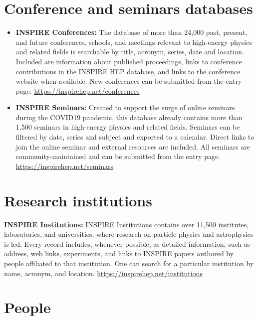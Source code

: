 \section{Conference and seminars databases}\label{databases:sec:conference}
\begin{itemize}
\tightlist
{}
\item
  \textbf{INSPIRE Conferences:} The database of more than 24,000 past,
  present, and future conferences, schools, and meetings relevant to
  high-energy physics and related fields is searchable by title,
  acronym, series, date and location. Included are information about
  published proceedings, links to conference contributions in the
  INSPIRE HEP database, and links to the conference website when
  available. New conferences can be submitted from the entry page.
  \url{https://inspirehep.net/conferences}
\item
  \textbf{INSPIRE Seminars:} Created to support the surge of online seminars during
  the COVID19 pandemic, this database already contains more than 1,500
  seminars in high-energy physics and related fields. Seminars can be filtered
  by date, series and subject and exported to a calendar. Direct links to join
  the online seminar and external resources are included. All seminars are
  community-maintained and can be submitted from the entry page.
  \url{https://inspirehep.net/seminars}
\end{itemize}

\section{Research institutions}\label{databases:sec:research}

  \textbf{INSPIRE Institutions:} INSPIRE Institutions contains over
  11,500 institutes, laboratories, and universities, where research on
  particle physics and astrophysics is led. Every record includes,
  whenever possible, as detailed information, such as address, web
  links, experiments, and links to INSPIRE papers authored by people
  affiliated to that institution. One can search for a particular
  institution by name, acronym, and location.
  \url{https://inspirehep.net/institutions}

\section{People}\label{databases:sec:people}

